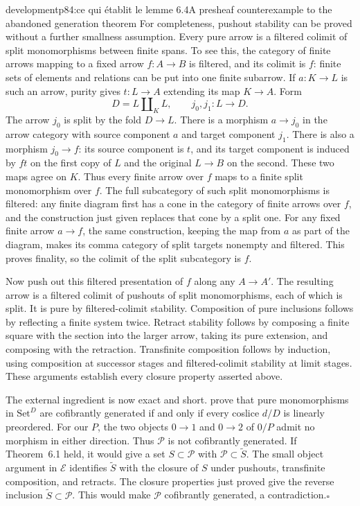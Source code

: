 \begin{dcomment}{development}{p84:ce qui établit le lemme 6.4}{A presheaf counterexample to the abandoned generation theorem}
For completeness, pushout stability can be proved without a further smallness assumption. Every pure arrow is a filtered colimit of split monomorphisms between finite spans. To see this, the category of finite arrows mapping to a fixed arrow $f:A\to B$ is filtered, and its colimit is $f$: finite sets of elements and relations can be put into one finite subarrow. If $a:K\to L$ is such an arrow, purity gives $t:L\to A$ extending its map $K\to A$. Form
\[
D=L\amalg_K L,
\qquad j_0,j_1:L\longrightarrow D.
\]
The arrow $j_0$ is split by the fold $D\to L$. There is a morphism $a\to j_0$ in the arrow category with source component $a$ and target component $j_1$. There is also a morphism $j_0\to f$: its source component is $t$, and its target component is induced by $ft$ on the first copy of $L$ and the original $L\to B$ on the second. These two maps agree on $K$. Thus every finite arrow over $f$ maps to a finite split monomorphism over $f$. The full subcategory of such split monomorphisms is filtered: any finite diagram first has a cone in the category of finite arrows over $f$, and the construction just given replaces that cone by a split one. For any fixed finite arrow $a\to f$, the same construction, keeping the map from $a$ as part of the diagram, makes its comma category of split targets nonempty and filtered. This proves finality, so the colimit of the split subcategory is $f$.

Now push out this filtered presentation of $f$ along any $A\to A'$. The resulting arrow is a filtered colimit of pushouts of split monomorphisms, each of which is split. It is pure by filtered-colimit stability. Composition of pure inclusions follows by reflecting a finite system twice. Retract stability follows by composing a finite square with the section into the larger arrow, taking its pure extension, and composing with the retraction. Transfinite composition follows by induction, using composition at successor stages and filtered-colimit stability at limit stages. These arguments establish every closure property asserted above.

The external ingredient is now exact and short. \citet[Theorem~5.1]{CoxFeigertKamsmaMazariArmidaRosicky2026} prove that pure monomorphisms in $\mathrm{Set}^{D}$ are cofibrantly generated if and only if every coslice $d/D$ is linearly preordered. For our $P$, the two objects $0\to1$ and $0\to2$ of $0/P$ admit no morphism in either direction. Thus $\mathcal P$ is not cofibrantly generated. If Theorem~6.1 held, it would give a set $S\subset\mathcal P$ with $\mathcal P\subset\widetilde S$. The small object argument in $\mathcal E$ identifies $\widetilde S$ with the closure of $S$ under pushouts, transfinite composition, and retracts. The closure properties just proved give the reverse inclusion $\widetilde S\subset\mathcal P$. This would make $\mathcal P$ cofibrantly generated, a contradiction.\hfill$\square$


\end{dcomment}
